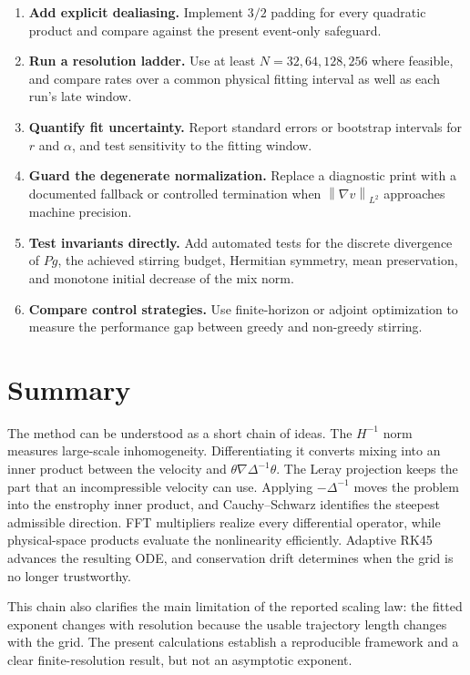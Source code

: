 \documentclass[12pt,a4paper]{article}
\newcommand{\norm}[1]{\left\lVert#1\right\rVert}
\newcommand{\lapinv}{\Delta^{-1}}
\newcommand{\Proj}{P}
\theoremstyle{definition}
\begin{document}
\begin{enumerate}
  \item \textbf{Add explicit dealiasing.} Implement $3/2$ padding for every
        quadratic product and compare against the present event-only
        safeguard.
  \item \textbf{Run a resolution ladder.} Use at least
        $N=32,64,128,256$ where feasible, and compare rates over a common
        physical fitting interval as well as each run's late window.
  \item \textbf{Quantify fit uncertainty.} Report standard errors or
        bootstrap intervals for $r$ and $\alpha$, and test sensitivity to
        the fitting window.
  \item \textbf{Guard the degenerate normalization.} Replace a diagnostic
        print with a documented fallback or controlled termination when
        $\norm{\nabla v}_{L^2}$ approaches machine precision.
  \item \textbf{Test invariants directly.} Add automated tests for the
        discrete divergence of $\Proj g$, the achieved stirring budget,
        Hermitian symmetry, mean preservation, and monotone initial
        decrease of the mix norm.
  \item \textbf{Compare control strategies.} Use finite-horizon or adjoint
        optimization to measure the performance gap between greedy and
        non-greedy stirring.
\end{enumerate}

\section{Summary}

The method can be understood as a short chain of ideas. The $H^{-1}$ norm
measures large-scale inhomogeneity. Differentiating it converts mixing into
an inner product between the velocity and
$\theta\nabla\lapinv\theta$. The Leray projection keeps the part that an
incompressible velocity can use. Applying $-\lapinv$ moves the problem into
the enstrophy inner product, and Cauchy--Schwarz identifies the steepest
admissible direction. FFT multipliers realize every differential operator,
while physical-space products evaluate the nonlinearity efficiently.
Adaptive RK45 advances the resulting ODE, and conservation drift determines
when the grid is no longer trustworthy.

This chain also clarifies the main limitation of the reported scaling law:
the fitted exponent changes with resolution because the usable trajectory
length changes with the grid. The present calculations establish a
reproducible framework and a clear finite-resolution result, but not an
asymptotic exponent.
\end{document}

